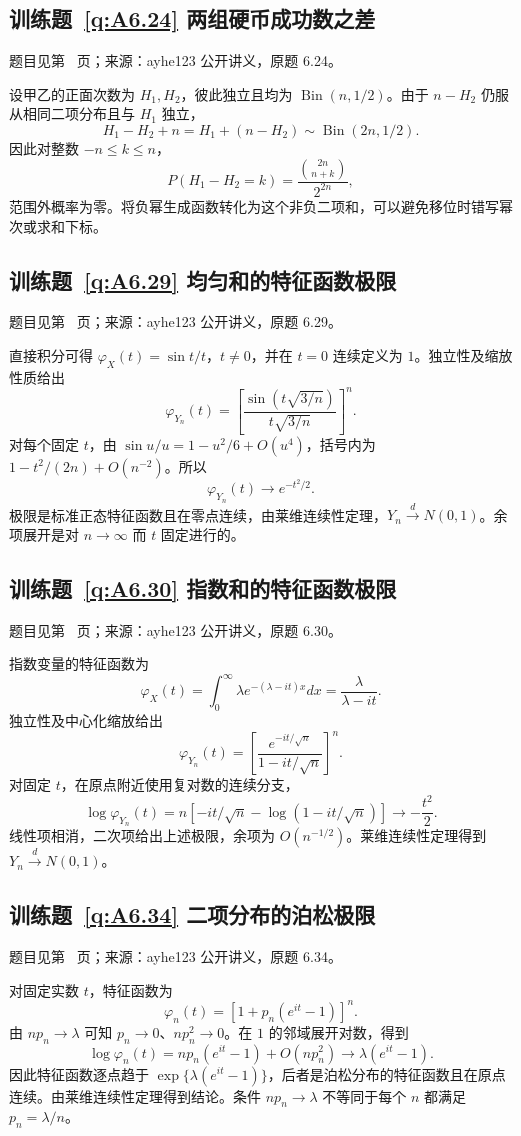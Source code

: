 \subsection*{训练题~\ref{q:A6.24} 两组硬币成功数之差}\label{a:A6.24}{\small 题目见第~\pageref{q:A6.24} 页；来源：ayhe123 公开讲义，原题 6.24。}
\begin{solve}设甲乙的正面次数为 $H_1,H_2$，彼此独立且均为 $\operatorname{Bin}(n,1/2)$。由于 $n-H_2$ 仍服从相同二项分布且与 $H_1$ 独立，\[H_1-H_2+n=H_1+(n-H_2)\sim\operatorname{Bin}(2n,1/2).\]因此对整数 $-n\le k\le n$，\[P(H_1-H_2=k)=\frac{\binom{2n}{n+k}}{2^{2n}},\]范围外概率为零。将负幂生成函数转化为这个非负二项和，可以避免移位时错写幂次或求和下标。\end{solve}

\subsection*{训练题~\ref{q:A6.29} 均匀和的特征函数极限}\label{a:A6.29}{\small 题目见第~\pageref{q:A6.29} 页；来源：ayhe123 公开讲义，原题 6.29。}
\begin{solve}直接积分可得 $\varphi_X(t)=\sin t/t$，$t\ne0$，并在 $t=0$ 连续定义为 $1$。独立性及缩放性质给出\[\varphi_{Y_n}(t)=\left[\frac{\sin(t\sqrt{3/n})}{t\sqrt{3/n}}\right]^n.\]对每个固定 $t$，由 $\sin u/u=1-u^2/6+O(u^4)$，括号内为 $1-t^2/(2n)+O(n^{-2})$。所以\[\varphi_{Y_n}(t)\to e^{-t^2/2}.\]极限是标准正态特征函数且在零点连续，由莱维连续性定理，$Y_n\xrightarrow dN(0,1)$。余项展开是对 $n\to\infty$ 而 $t$ 固定进行的。\end{solve}

\subsection*{训练题~\ref{q:A6.30} 指数和的特征函数极限}\label{a:A6.30}{\small 题目见第~\pageref{q:A6.30} 页；来源：ayhe123 公开讲义，原题 6.30。}
\begin{solve}指数变量的特征函数为\[\varphi_X(t)=\int_0^\infty\lambda e^{-(\lambda-it)x}dx=\frac{\lambda}{\lambda-it}.\]独立性及中心化缩放给出\[\varphi_{Y_n}(t)=\left[\frac{e^{-it/\sqrt n}}{1-it/\sqrt n}\right]^n.\]对固定 $t$，在原点附近使用复对数的连续分支，\[\log\varphi_{Y_n}(t)=n[-it/\sqrt n-\log(1-it/\sqrt n)]\to-\frac{t^2}2.\]线性项相消，二次项给出上述极限，余项为 $O(n^{-1/2})$。莱维连续性定理得到 $Y_n\xrightarrow dN(0,1)$。\end{solve}

\subsection*{训练题~\ref{q:A6.34} 二项分布的泊松极限}\label{a:A6.34}{\small 题目见第~\pageref{q:A6.34} 页；来源：ayhe123 公开讲义，原题 6.34。}
\begin{solve}对固定实数 $t$，特征函数为\[\varphi_n(t)=[1+p_n(e^{it}-1)]^n.\]由 $np_n\to\lambda$ 可知 $p_n\to0$、$np_n^2\to0$。在 $1$ 的邻域展开对数，得到\[\log\varphi_n(t)=np_n(e^{it}-1)+O(np_n^2)\to\lambda(e^{it}-1).\]因此特征函数逐点趋于 $\exp\{\lambda(e^{it}-1)\}$，后者是泊松分布的特征函数且在原点连续。由莱维连续性定理得到结论。条件 $np_n\to\lambda$ 不等同于每个 $n$ 都满足 $p_n=\lambda/n$。\end{solve}

